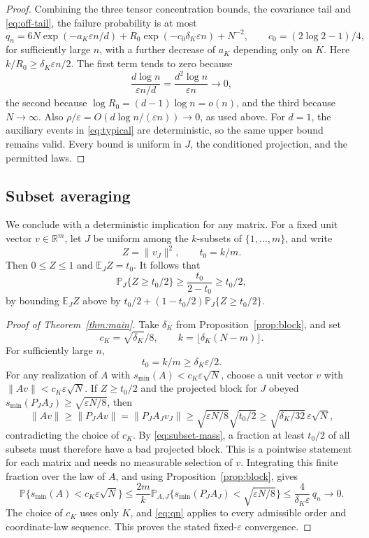 \documentclass[11pt]{article}
\newcommand{\R}{\mathbb R}
\newcommand{\E}{\mathbb E}
\newcommand{\Prob}{\mathbb P}
\begin{document}
\begin{proof}
Combining the three tensor concentration bounds, the covariance
tail and \eqref{eq:off-tail}, the failure probability is at most
\begin{equation}\label{eq:qn}
 q_n=6N\exp(-a_K\varepsilon n/d)
       +R_0\exp(-c_0\delta_K\varepsilon n)+N^{-2},
 \qquad c_0=(2\log2-1)/4,
\end{equation}
for sufficiently large \(n\), with a further decrease of \(a_K\)
depending only on \(K\).
Here \(k/R_0\ge\delta_K\varepsilon n/2\).
The first term tends to zero because
\[
 \frac{d\log n}{\varepsilon n/d}
       =\frac{d^2\log n}{\varepsilon n}\longrightarrow0,
\]
the second because \(\log R_0=(d-1)\log n=o(n)\),
and the third because \(N\to\infty\).
Also \(\rho/\varepsilon=O(d\log n/(\varepsilon n))\to0\),
as used above.
For \(d=1\), the auxiliary events in \eqref{eq:typical} are
deterministic, so the same upper bound remains valid.
Every bound is uniform in \(J\), the conditioned projection,
and the permitted laws.
\end{proof}

\subsection{Subset averaging}

We conclude with a deterministic implication for any matrix.
For a fixed unit vector \(v\in\R^m\), let \(J\) be uniform among
the \(k\)-subsets of \(\{1,\ldots,m\}\), and write
\[
 Z=\|v_J\|^2,\qquad t_0=k/m.
\]
Then \(0\le Z\le1\) and \(\E_JZ=t_0\). It follows that
\begin{equation}\label{eq:subset-mass}
 \Prob_J\{Z\ge t_0/2\}
 \ge\frac{t_0}{2-t_0}\ge t_0/2,
\end{equation}
by bounding \(\E_JZ\) above by
\(t_0/2+(1-t_0/2)\Prob_J\{Z\ge t_0/2\}\).

\begin{proof}[Proof of Theorem~\ref{thm:main}]
Take \(\delta_K\) from Proposition~\ref{prop:block}, and set
\[
 c_K=\sqrt{\delta_K}/8,\qquad
 k=\lfloor\delta_K(N-m)\rfloor.
\]
For sufficiently large \(n\),
\[
 t_0=k/m\ge\delta_K\varepsilon/2.
\]
For any realization of \(A\) with
\(s_{\min}(A)<c_K\varepsilon\sqrt N\), choose a unit vector \(v\)
with \(\|Av\|<c_K\varepsilon\sqrt N\).
If \(Z\ge t_0/2\) and the projected block for \(J\) obeyed
\(s_{\min}(P_JA_J)\ge\sqrt{\varepsilon N/8}\), then
\[
 \|Av\|\ge\|P_JAv\|=\|P_JA_Jv_J\|
 \ge\sqrt{\varepsilon N/8}\sqrt{t_0/2}
 \ge\sqrt{\delta_K/32}\,\varepsilon\sqrt N,
\]
contradicting the choice of \(c_K\).
By \eqref{eq:subset-mass}, a fraction at least \(t_0/2\)
of all subsets must therefore have a bad projected block.
This is a pointwise statement for each matrix and needs no
measurable selection of \(v\).
Integrating this finite fraction over the law of \(A\), and using
Proposition~\ref{prop:block}, gives
\[
 \Prob\{s_{\min}(A)<c_K\varepsilon\sqrt N\}
 \le\frac{2m}{k}\Prob_{A,J}
       \{s_{\min}(P_JA_J)<\sqrt{\varepsilon N/8}\}
 \le\frac4{\delta_K\varepsilon}\,q_n
 \longrightarrow0.
\]
The choice of \(c_K\) uses only \(K\), and \eqref{eq:qn}
applies to every admissible order and coordinate-law sequence.
This proves the stated fixed-\(\varepsilon\) convergence.
\end{proof}
\end{document}
